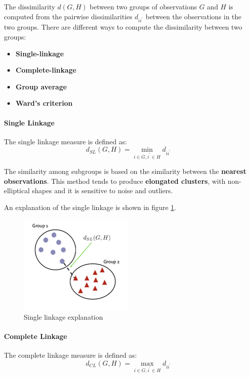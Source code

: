 The dissimilarity $d(G,H)$ between two groups of observations $G$ and $H$ is computed from the pairwise dissimilarities $d_{ii^{\prime}}$ between the observations in the two groups. There are different ways to compute the dissimilarity between two groups:
\begin{itemize}
    \item \textbf{Single-linkage}
    \item \textbf{Complete-linkage}
    \item \textbf{Group average}
    \item \textbf{Ward's criterion}
\end{itemize}

\paragraph*{Single Linkage}
The single linkage measure is defined as:
\[
    d_{SL}(G,H) = \min_{i \in G, i^{\prime} \in H} d_{ii^{\prime}}
\]

The similarity among subgroups is based on the similarity between the \textbf{nearest observations}. This method tends to produce \textbf{elongated clusters}, with non-elliptical shapes and it is sensitive to noise and outliers.

An explanation of the single linkage is shown in figure \ref{fig:singlelinkage}.
\begin{figure}[h]
    \centering
    \includegraphics[width=0.5\textwidth]{./figures/chapter_7/singlelinkage.png}
    \caption{Single linkage explanation}
    \label{fig:singlelinkage}
\end{figure}

\paragraph*{Complete Linkage}
The complete linkage measure is defined as:
\[
    d_{CL}(G,H) = \max_{i \in G, i^{\prime} \in H} d_{ii^{\prime}}
\]

